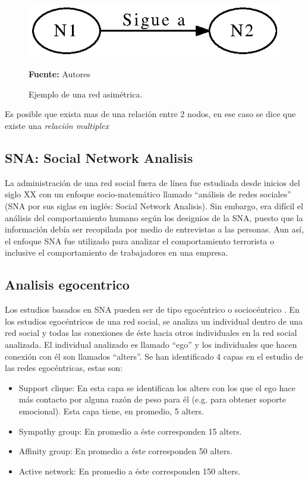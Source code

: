 \begin{figure}[!htb]
  \begin{center}
    \includegraphics{./imagenes/Red_asimetrica.eps}
    \caption{Ejemplo de una red asimétrica.}
    \label{fig:asimetrica}
    \textbf{Fuente:}  Autores
  \end{center}
\end{figure}

Es posible que exista mas de una relación entre 2 nodos, en ese caso se dice que existe una \textit{relación multiplex} \cite[Cap.2]{cap_sna}

\subsection{SNA: Social Network Analisis}

La administración de una red social fuera de línea fue estudiada desde inicios del siglo XX \cite{dynamics} con un enfoque socio-matemático llamado “análisis de redes sociales” (SNA por sus siglas en inglés: Social Network Analisis). Sin embargo, era difícil el análisis del comportamiento humano según los designios de la SNA, puesto que la información debía ser recopilada por medio de entrevistas a las personas. Aun así, el enfoque SNA fue utilizado para analizar el comportamiento terrorista o inclusive el comportamiento de trabajadores en una empresa. \cite{sna_startups}

\subsection{Analisis egocentrico} \label{sec:egocentrico}

Los estudios basados en SNA pueden ser de tipo egocéntrico o sociocéntrico \cite{user_behavior}. En los estudios egocéntricos de una red social, se analiza un individual dentro de una red social y todas las conexiones de éste hacia otros individuales en la red social analizada. El individual analizado es llamado “ego” y los individuales que hacen conexión con él son llamados “alters”. Se han identificado 4 capas en el estudio de las redes egocéntricas, estas son:

\begin{itemize}
  \item Support clique: En esta capa se identifican los alters con los que el ego hace más contacto por alguna razón de peso para él (e.g. para obtener soporte emocional). Esta capa tiene, en promedio, 5 alters.
  \item Sympathy group: En promedio a éste corresponden 15 alters.
  \item Affinity group: En promedio a éste corresponden 50 alters.
  \item Active network: En promedio a éste corresponden 150 alters.
\end{itemize}

